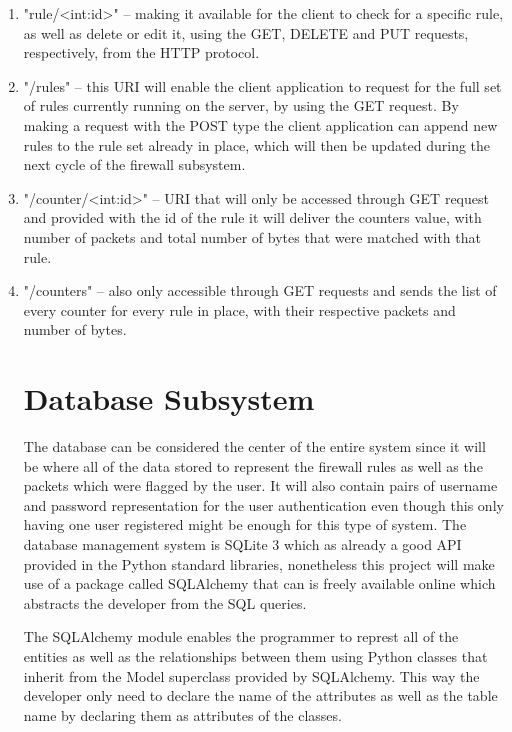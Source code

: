 \begin{enumerate}
	\item "rule/<int:id>" -- making it available for the client to check for a
		specific rule, as well as delete or edit it, using the GET, DELETE and
		PUT requests, respectively, from the HTTP protocol.
	\item "/rules" -- this URI will enable the client application to request for
		the full set of rules currently running on the server, by using the GET
		request. By making a request with the POST type the client application
		can append new rules to the rule set already in place, which will then
		be updated during the next cycle of the firewall subsystem.
	\item "/counter/<int:id>" -- URI that will only be accessed through GET
		request and provided with the id of the rule it will deliver the
		counters value, with number of packets and total number of bytes that
		were matched with that rule.
	\item "/counters" -- also only accessible through GET requests and sends the
		list of every counter for every rule in place, with their respective
		packets and number of bytes.

\section{Database Subsystem}
\label{chap4:sec:db-sys}
The database can be considered the center of the entire system since it will be
where all of the data stored to represent the firewall rules as well as the
packets which were flagged by the user. It will also contain pairs of username
and password representation for the user authentication even though this only
having one user registered might be enough for this type of system.
The database management system is SQLite 3 which as already a good API provided
in the Python standard libraries, nonetheless this project will make use of a
package called SQLAlchemy that can is freely available online which abstracts
the developer from the SQL queries.

The SQLAlchemy module enables the programmer to represt all of the entities as
well as the relationships between them using Python classes that inherit from
the Model superclass provided by SQLAlchemy. This way the developer only need to
declare the name of the attributes as well as the table name by declaring them
as attributes of the classes.


\end{enumerate}
